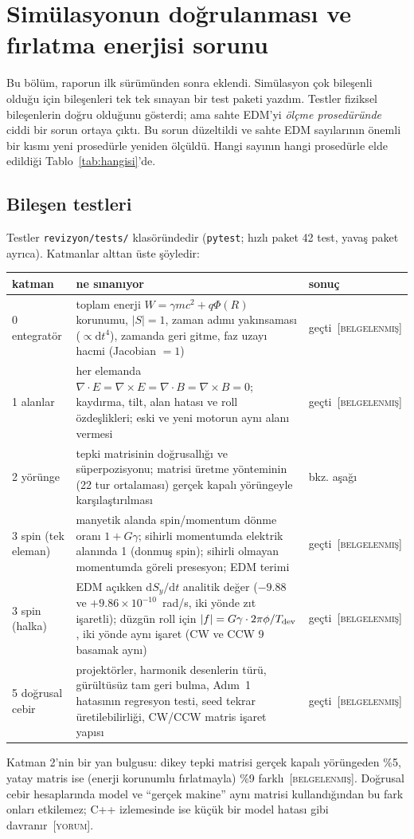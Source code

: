 \documentclass[11pt,a4paper]{article}
\newcommand{\kod}[1]{{\XeTeXinterchartokenstate=0\texttt{#1}}}
\newcommand{\BEL}{\textsc{[belgelenmiş]}}
\newcommand{\YOR}{\textsc{[yorum]}}
\begin{document}
\section{Simülasyonun doğrulanması ve fırlatma enerjisi sorunu}\label{sec:enerji}

Bu bölüm, raporun ilk sürümünden sonra eklendi. Simülasyon çok bileşenli olduğu için bileşenleri tek tek
sınayan bir test paketi yazdım. Testler fiziksel bileşenlerin doğru olduğunu gösterdi; ama sahte EDM'yi
\emph{ölçme prosedüründe} ciddi bir sorun ortaya çıktı. Bu sorun düzeltildi ve sahte EDM sayılarının
önemli bir kısmı yeni prosedürle yeniden ölçüldü. Hangi sayının hangi prosedürle elde edildiği
Tablo~\ref{tab:hangisi}'de.

\subsection{Bileşen testleri}
Testler \kod{revizyon/tests/} klasöründedir (\kod{pytest}; hızlı paket 42 test, yavaş paket ayrıca).
Katmanlar alttan üste şöyledir:
\begin{center}\small
\begin{tabularx}{\textwidth}{lXl}
\toprule
katman & ne sınanıyor & sonuç \\
\midrule
0 entegratör & toplam enerji $W=\gamma mc^2+q\Phi(R)$ korunumu, $|S|=1$, zaman adımı yakınsaması
($\propto\mathrm{d}t^4$), zamanda geri gitme, faz uzayı hacmi (Jacobian $=1$) & geçti~\BEL \\
1 alanlar & her elemanda $\nabla\cdot E=\nabla\times E=\nabla\cdot B=\nabla\times B=0$; kaydırma, tilt,
alan hatası ve roll özdeşlikleri; eski ve yeni motorun aynı alanı vermesi & geçti~\BEL \\
2 yörünge & tepki matrisinin doğrusallığı ve süperpozisyonu; matrisi üretme yönteminin (22 tur ortalaması)
gerçek kapalı yörüngeyle karşılaştırılması & bkz. aşağı \\
3 spin (tek eleman) & manyetik alanda spin/momentum dönme oranı $1+G\gamma$; sihirli momentumda
elektrik alanında 1 (donmuş spin); sihirli olmayan momentumda göreli presesyon; EDM terimi & geçti~\BEL \\
3 spin (halka) & EDM açıkken $\mathrm{d}S_y/\mathrm{d}t$ analitik değer ($-9.88$ ve $+9.86\times10^{-10}$~rad/s,
iki yönde zıt işaretli); düzgün roll için $|f|=G\gamma\cdot2\pi\phi/T_{\rm dev}$, iki yönde aynı işaret
(CW ve CCW 9 basamak aynı) & geçti~\BEL \\
5 doğrusal cebir & projektörler, harmonik desenlerin türü, gürültüsüz tam geri bulma, Adım~1 hatasının
regresyon testi, seed tekrar üretilebilirliği, CW/CCW matris işaret yapısı & geçti~\BEL \\
\bottomrule
\end{tabularx}
\end{center}
Katman 2'nin bir yan bulgusu: dikey tepki matrisi gerçek kapalı yörüngeden \%5, yatay matris ise (enerji
korunumlu fırlatmayla) \%9 farklı~\BEL. Doğrusal cebir hesaplarında model ve ``gerçek makine'' aynı
matrisi kullandığından bu fark onları etkilemez; C++ izlemesinde ise küçük bir model hatası gibi davranır~\YOR.
\end{document}
